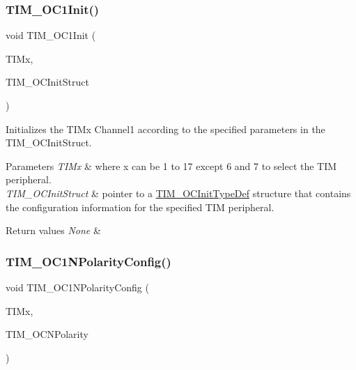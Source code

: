 \subsubsection{\texorpdfstring{TIM\_OC1Init()}{TIM\_OC1Init()}}
{\footnotesize\ttfamily void T\+I\+M\+\_\+\+O\+C1\+Init (\begin{DoxyParamCaption}\item[{\mbox{\hyperlink{struct_t_i_m___type_def}{T\+I\+M\+\_\+\+Type\+Def}} $\ast$}]{T\+I\+Mx,  }\item[{\mbox{\hyperlink{struct_t_i_m___o_c_init_type_def}{T\+I\+M\+\_\+\+O\+C\+Init\+Type\+Def}} $\ast$}]{T\+I\+M\+\_\+\+O\+C\+Init\+Struct }\end{DoxyParamCaption})}



Initializes the T\+I\+Mx Channel1 according to the specified parameters in the T\+I\+M\+\_\+\+O\+C\+Init\+Struct. 


\begin{DoxyParams}{Parameters}
{\em T\+I\+Mx} & where x can be 1 to 17 except 6 and 7 to select the T\+IM peripheral. \\
\hline
{\em T\+I\+M\+\_\+\+O\+C\+Init\+Struct} & pointer to a \mbox{\hyperlink{struct_t_i_m___o_c_init_type_def}{T\+I\+M\+\_\+\+O\+C\+Init\+Type\+Def}} structure that contains the configuration information for the specified T\+IM peripheral. \\
\hline
\end{DoxyParams}

\begin{DoxyRetVals}{Return values}
{\em None} & \\
\hline
\end{DoxyRetVals}
\mbox{\label{group___t_i_m___exported___functions_ga3cb91578e7dd34ea7d09862482960445}} 
\subsubsection{\texorpdfstring{TIM\_OC1NPolarityConfig()}{TIM\_OC1NPolarityConfig()}}
{\footnotesize\ttfamily void T\+I\+M\+\_\+\+O\+C1\+N\+Polarity\+Config (\begin{DoxyParamCaption}\item[{\mbox{\hyperlink{struct_t_i_m___type_def}{T\+I\+M\+\_\+\+Type\+Def}} $\ast$}]{T\+I\+Mx,  }\item[{uint16\+\_\+t}]{T\+I\+M\+\_\+\+O\+C\+N\+Polarity }\end{DoxyParamCaption})}



